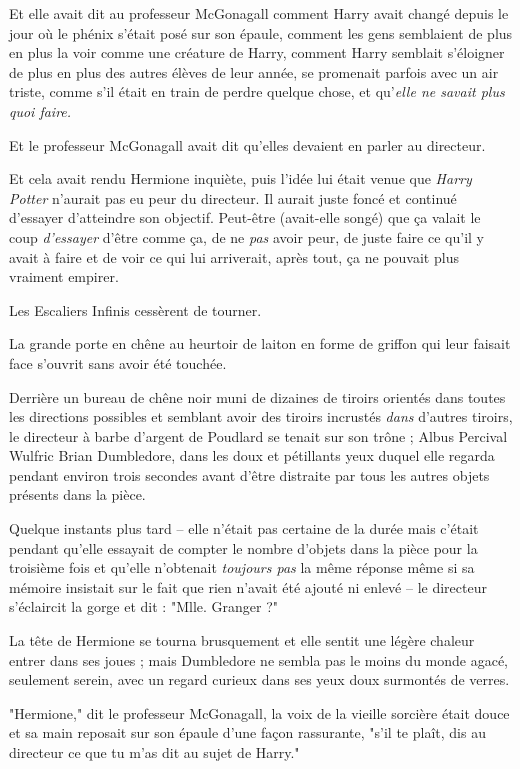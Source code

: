 Et elle avait dit au professeur McGonagall comment Harry avait changé depuis le jour où le phénix s'était posé sur son épaule, comment les gens semblaient de plus en plus la voir comme une créature de Harry, comment Harry semblait s'éloigner de plus en plus des autres élèves de leur année, se promenait parfois avec un air triste, comme s'il était en train de perdre quelque chose, et qu'\emph{elle ne savait plus quoi faire.} 

Et le professeur McGonagall avait dit qu'elles devaient en parler au directeur.

Et cela avait rendu Hermione inquiète, puis l'idée lui était venue que \emph{Harry Potter}  n'aurait pas eu peur du directeur. Il aurait juste foncé et continué d'essayer d'atteindre son objectif. Peut-être (avait-elle songé) que ça valait le coup \emph{d'essayer}  d'être comme ça, de ne \emph{pas}  avoir peur, de juste faire ce qu'il y avait à faire et de voir ce qui lui arriverait, après tout, ça ne pouvait plus vraiment empirer.

Les Escaliers Infinis cessèrent de tourner.

La grande porte en chêne au heurtoir de laiton en forme de griffon qui leur faisait face s'ouvrit sans avoir été touchée.

Derrière un bureau de chêne noir muni de dizaines de tiroirs orientés dans toutes les directions possibles et semblant avoir des tiroirs incrustés \emph{dans}  d'autres tiroirs, le directeur à barbe d'argent de Poudlard se tenait sur son trône ; Albus Percival Wulfric Brian Dumbledore, dans les doux et pétillants yeux duquel elle regarda pendant environ trois secondes avant d'être distraite par tous les autres objets présents dans la pièce.

Quelque instants plus tard – elle n'était pas certaine de la durée mais c'était pendant qu'elle essayait de compter le nombre d'objets dans la pièce pour la troisième fois et qu'elle n'obtenait \emph{toujours pas}  la même réponse même si sa mémoire insistait sur le fait que rien n'avait été ajouté ni enlevé – le directeur s'éclaircit la gorge et dit : "Mlle. Granger ?"

La tête de Hermione se tourna brusquement et elle sentit une légère chaleur entrer dans ses joues ; mais Dumbledore ne sembla pas le moins du monde agacé, seulement serein, avec un regard curieux dans ses yeux doux surmontés de verres.

"Hermione," dit le professeur McGonagall, la voix de la vieille sorcière était douce et sa main reposait sur son épaule d'une façon rassurante, "s'il te plaît, dis au directeur ce que tu m'as dit au sujet de Harry."

